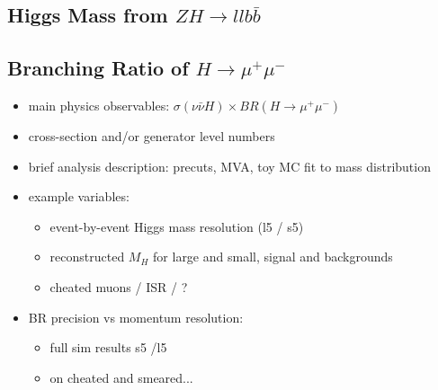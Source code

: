 \subsection{Higgs Mass from $ZH \to ll b\bar{b}$}
\subsection{Branching Ratio of $H \to \mu^+\mu^-$}
\begin{itemize}
\item main physics observables: $\sigma(\nu\bar{\nu} H)\times BR(H\to \mu^+\mu^-)$
\item cross-section and/or generator level numbers  
\item brief analysis description: precuts, MVA, toy MC fit to mass distribution
\item example variables: 
  \begin{itemize}
     \item event-by-event Higgs mass resolution (l5 / s5)
     \item reconstructed $M_H$ for large and small, signal and backgrounds
   
     \item cheated muons / ISR / ?
  \end{itemize}
\item BR precision vs momentum resolution: 
  \begin{itemize}
     \item full sim results s5 /l5
     \item on cheated and smeared...
  \end{itemize}
\end{itemize}

